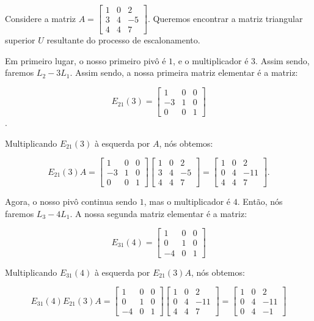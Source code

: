 \begin{Example}
	Considere a matriz $A = \begin{bmatrix}
		1 & 0 & 2 \\
		3 & 4 & -5 \\
		4 & 4 & 7
	\end{bmatrix}$. Queremos encontrar a matriz triangular superior $U$ resultante do processo de escalonamento.
	
	Em primeiro lugar, o nosso primeiro pivô é $1$, e o multiplicador é $3$. Assim sendo, faremos $L_2 - 3L_1$. Assim sendo, a nossa primeira matriz elementar é a matriz:
	
	$$
	E_{21}(3) = \begin{bmatrix}
		1 & 0 & 0 \\
		-3 & 1 & 0 \\
		0 & 0 & 1
	\end{bmatrix}
	$$.
	
	Multiplicando $E_{21}(3)$ à esquerda por $A$, nós obtemos:
	
	$$
	E_{21}(3)A = \begin{bmatrix}
		1 & 0 & 0 \\
		-3 & 1 & 0 \\
		0 & 0 & 1
	\end{bmatrix}
	\begin{bmatrix}
		1 & 0 & 2 \\
		3 & 4 & -5 \\
		4 & 4 & 7
	\end{bmatrix} = 
	\begin{bmatrix}
		1 & 0 & 2 \\
		0 & 4 & -11 \\
		4 & 4 & 7
	\end{bmatrix}.
	$$
	
	Agora, o nosso pivô continua sendo $1$, mas o multiplicador é $4$. Então, nós faremos $L_3 - 4L_1$. A nossa segunda matriz elementar é a matriz:
	
	$$
	E_{31}(4) = \begin{bmatrix}
		1 & 0 & 0 \\
		0 & 1 & 0 \\
		-4 & 0 & 1
	\end{bmatrix}
	$$
	
	Multiplicando $E_{31}(4)$ à esquerda por $E_{21}(3)A$, nós obtemos:
	
	$$
	E_{31}(4)E_{21}(3)A = \begin{bmatrix}
		1 & 0 & 0 \\
		0 & 1 & 0 \\
		-4 & 0 & 1
	\end{bmatrix}
	\begin{bmatrix}
		1 & 0 & 2 \\
		0 & 4 & -11 \\
		4 & 4 & 7
	\end{bmatrix} = 
	\begin{bmatrix}
		1 & 0 & 2 \\
		0 & 4 & -11 \\
		0 & 4 & -1
	\end{bmatrix}
	$$
	

\end{Example}
